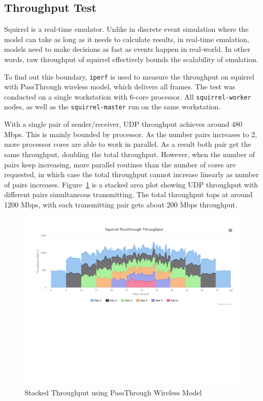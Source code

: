 \documentclass[12pt]{report}
\begin{document}
\subsection{Throughput Test}

Squirrel is a real-time emulator. Unlike in discrete event simulation where the model can take as long as it needs to calculate results, in real-time emulation, models need to make decisions as fast as events happen in real-world. In other words, raw throughput of squirrel effectively bounds the scalability of emulation.

To find out this boundary, \texttt{iperf} is used to measure the throughput on squirrel with PassThrough wireless model, which delivers all frames. The test was conducted on a single workstation with 6-core processor. All \texttt{squirrel-worker} nodes, as well as the \texttt{squirrel-master} run on the same workstation.

With a single pair of sender/receiver, UDP throughput achieves around 480 Mbps. This is mainly bounded by processor. As the number pairs increases to 2, more processor cores are able to work in parallel. As a result both pair get the same throughput, doubling the total throughput. However, when the number of pairs keep increasing, more parallel routines than the number of cores are requested, in which case the total throughput cannot increase linearly as number of pairs increases. Figure~\ref{fig:passthrough} is a stacked area plot showing UDP throughput with different pairs simultaneous transmitting. The total throughput tops at around 1200 Mbps, with each transmitting pair gets about 200 Mbps throughput.

\begin{figure}[h]
  \includegraphics[width=\textwidth]{figures/results/passthrough.pdf}
  \caption{\label{fig:passthrough}Stacked Throughput using PassThrough Wireless Model}
\end{figure}
\end{document}
